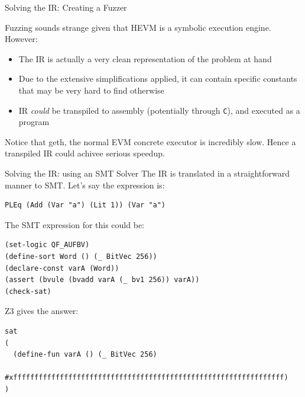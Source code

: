 \documentclass[aspectratio=169]{beamer}
\begin{document}
\begin{frame}[fragile=singleslide]{Solving the IR: Creating a Fuzzer}

Fuzzing sounds strange given that HEVM is a symbolic execution engine. However:
\begin{itemize}
\item The IR is actually a very clean representation of the problem at hand
\item Due to the extensive simplifications applied, it can contain specific constants that may be very hard to find otherwise
\item IR \emph{could} be transpiled to assembly (potentially through \texttt{C}), and executed as a program
\end{itemize}
\bigskip

Notice that geth, the normal EVM concrete executor is incredibly slow. Hence a transpiled IR could achivee serious speedup.

\end{frame}

\begin{frame}[fragile=singleslide]{Solving the IR: using an SMT Solver}
The IR is translated in a straightforward manner to SMT. Let's say the expression is:

\begin{Verbatim}[frame=single, framerule=0.2mm, framesep=2mm,fontsize=\footnotesize]
PLEq (Add (Var "a") (Lit 1)) (Var "a")
\end{Verbatim}
\bigskip

The SMT expression for this could be:

\begin{Verbatim}[frame=single, framerule=0.2mm, framesep=2mm,fontsize=\footnotesize]
(set-logic QF_AUFBV)
(define-sort Word () (_ BitVec 256))
(declare-const varA (Word))
(assert (bvule (bvadd varA (_ bv1 256)) varA))
(check-sat)
\end{Verbatim}

Z3 gives the answer:

\begin{Verbatim}[frame=single, framerule=0.2mm, framesep=2mm,fontsize=\footnotesize]
sat
(
  (define-fun varA () (_ BitVec 256)
    #xffffffffffffffffffffffffffffffffffffffffffffffffffffffffffffffff)
)
\end{Verbatim}
\end{frame}
\end{document}

